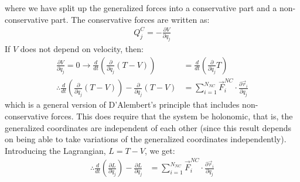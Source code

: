 where we have split up the generalized forces into a conservative part and a non-conservative part. The conservative forces are written as:
\begin{align}
Q_j^C=-\frac{\partial V}{\partial q_j}
\label{eqn:ConsGen}
\end{align}
If $V$ does not depend on velocity, then:
\begin{align}
\frac{\partial V}{\partial \dot{q}_j}=0 \to \frac{d}{dt}\left(\frac{\partial }{\partial \dot{q}_j}(T-V) \right) &=\frac{d}{dt}\left(\frac{\partial }{\partial \dot{q}_j} T \right)\nonumber\\
\therefore \frac{d}{dt}\left(\frac{\partial }{\partial \dot{q}_j} (T-V) \right) - \frac{\partial }{\partial q_j}(T-V)&=\sum_{i=1}^{N_{NC}}\vec{F}_i^{NC}\cdot\frac{\partial\vec{r}_i}{\partial q_j}
\end{align} 
which is a general version of D'Alembert's principle that includes non-conservative forces. This does require that the system be holonomic, that is, the generalized coordinates are independent of each other (since this result depends on being able to take variations of the generalized coordinates independently). Introducing the Lagrangian, $L=T-V$, we get:
\begin{align}
\therefore \frac{d}{dt}\left(\frac{\partial L}{\partial \dot{q}_j} \right) - \frac{\partial L}{\partial q_j}&=\sum_{i=1}^{N_{NC}}\vec{F}_i^{NC}\cdot\frac{\partial\vec{r}_i}{\partial q_j}
\end{align} 

